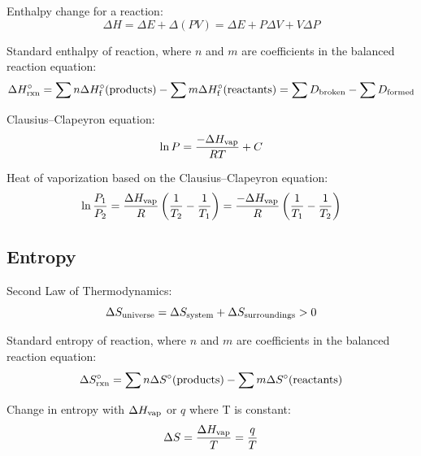 \documentclass[10pt]{article}
\begin{document}
Enthalpy change for a reaction:
\begin{equation*}
\Delta H = \Delta E + \Delta(PV) = \Delta E + P\Delta V + V\Delta P
\end{equation*}

Standard enthalpy of reaction, where $n$ and $m$ are coefficients in the balanced reaction equation:
\begin{equation*}
\Delta H\not_\textnormal{rxn} = \sum{n\Delta H\not_\textnormal{f}(\textnormal{products})}-\sum{m\Delta H\not_\textnormal{f}(\textnormal{reactants})} = \sum{D_\textnormal{broken}} - \sum{D_\textnormal{formed}} 
\end{equation*}

Clausius--Clapeyron equation:
\begin{equation*}
\ln P = \frac{-\Delta H_\textnormal{vap}}{RT}+C
\end{equation*}

Heat of vaporization based on the Clausius--Clapeyron equation:
\begin{equation*}
\ln \frac{P_1}{P_2} = \frac{\Delta H_\textnormal{vap}}{R}\left(\frac{1}{T_2} - \frac{1}{T_1}\right) = \frac{-\Delta H_\textnormal{vap}}{R}\left(\frac{1}{T_1} - \frac{1}{T_2}\right)
\end{equation*}


\newpage
\subsection{Entropy}

Second Law of Thermodynamics:
\begin{equation*}
\Delta S_\textnormal{universe} = \Delta S_\textnormal{system} + \Delta S_\textnormal{surroundings} > 0
\end{equation*}

Standard entropy of reaction, where $n$ and $m$ are coefficients in the balanced reaction equation:
\begin{equation*}
\Delta S\not_\textnormal{rxn} = \sum{n\Delta S\not(\textnormal{products})}-\sum{m\Delta S\not(\textnormal{reactants})}
\end{equation*}

Change in entropy with $\Delta H_{\textnormal{vap}}$ or $q$ where T is constant:
\begin{equation*}
\Delta S = \frac{\Delta H_{\textnormal{vap}}}{T} = \frac{q}{T}
\end{equation*}
\end{document}
